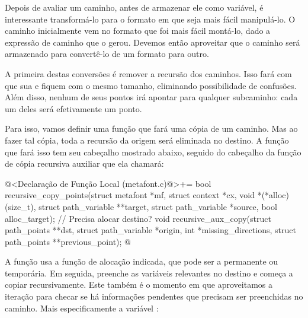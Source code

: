 Depois de avaliar um caminho, antes de armazenar ele como variável, é
interessante transformá-lo para o formato em que seja mais fácil
manipulá-lo. O caminho inicialmente vem no formato que foi mais fácil
montá-lo, dado a expressão de caminho que o gerou. Devemos então
aproveitar que o caminho será armazenado para convertê-lo de um
formato para outro.

A primeira destas conversões é remover a recursão dos caminhos. Isso
fará com que sua  e 
fiquem com o mesmo tamanho, eliminando possibilidade de
confusões. Além disso, nenhum de seus pontos irá apontar para qualquer
subcaminho: cada um deles será efetivamente um ponto.

Para isso, vamos definir uma função que fará uma cópia de um
caminho. Mas ao fazer tal cópia, toda a recursão da origem será
eliminada no destino. A função que fará isso tem seu cabeçalho
mostrado abaixo, seguido do cabeçalho da função de cópia recursiva
auxiliar que ela chamará:

\iniciocodigo
@<Declaração de Função Local (metafont.c)@>+=
bool recursive_copy_points(struct metafont *mf, struct context *cx,
                           void *(*alloc)(size_t),
                           struct path_variable **target,
                           struct path_variable *source,
                           bool alloc_target); // Precisa alocar destino?
void recursive_aux_copy(struct path_points **dst,
                        struct path_variable *origin, int *missing_directions,
                        struct path_points **previous_point);
@
\fimcodigo

A função usa a função de alocação indicada, que pode ser a permanente
ou temporária. Em seguida, preenche as variáveis relevantes no destino
e começa a copiar recursivamente. Este também é o momento em que
aproveitamos a iteração para checar se há informações pendentes que
precisam ser preenchidas no caminho. Mais especificamente a
variável :

